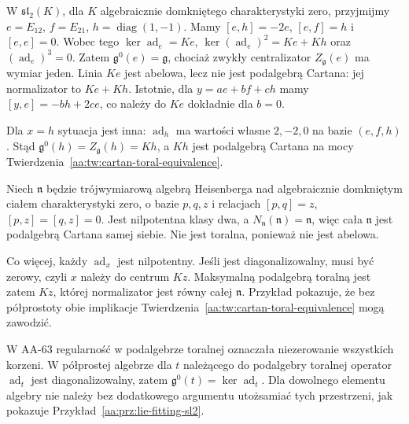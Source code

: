 \begin{przyklad}
\label{aa:prz:lie-fitting-sl2}
W $\mathfrak{sl}_2(K)$, dla $K$ algebraicznie domkniętego charakterystyki zero, przyjmijmy $e=E_{12}$, $f=E_{21}$, $h=\operatorname{diag}(1,-1)$. Mamy $[e,h]=-2e$, $[e,f]=h$ i $[e,e]=0$. Wobec tego
$\ker\operatorname{ad}_e=Ke$, $\ker(\operatorname{ad}_e)^2=Ke+Kh$ oraz $(\operatorname{ad}_e)^3=0$. Zatem $\mathfrak g^0(e)=\mathfrak g$, chociaż zwykły centralizator $Z_{\mathfrak g}(e)$ ma wymiar jeden. Linia $Ke$ jest abelowa, lecz nie jest podalgebrą Cartana: jej normalizator to $Ke+Kh$. Istotnie, dla $y=ae+bf+ch$ mamy $[y,e]=-bh+2ce$, co należy do $Ke$ dokładnie dla $b=0$.

Dla $x=h$ sytuacja jest inna: $\operatorname{ad}_h$ ma wartości własne $2,-2,0$ na bazie $(e,f,h)$. Stąd $\mathfrak g^0(h)=Z_{\mathfrak g}(h)=Kh$, a $Kh$ jest podalgebrą Cartana na mocy Twierdzenia~\ref{aa:tw:cartan-toral-equivalence}.
\end{przyklad}

\begin{przyklad}
\label{aa:prz:cartan-nontoral}
Niech $\mathfrak n$ będzie trójwymiarową algebrą Heisenberga nad algebraicznie domkniętym ciałem charakterystyki zero, o bazie $p,q,z$ i relacjach $[p,q]=z$, $[p,z]=[q,z]=0$. Jest nilpotentna klasy dwa, a $N_{\mathfrak n}(\mathfrak n)=\mathfrak n$, więc cała $\mathfrak n$ jest podalgebrą Cartana samej siebie. Nie jest toralna, ponieważ nie jest abelowa.

Co więcej, każdy $\operatorname{ad}_x$ jest nilpotentny. Jeśli jest diagonalizowalny, musi być zerowy, czyli $x$ należy do centrum $Kz$. Maksymalną podalgebrą toralną jest zatem $Kz$, której normalizator jest równy całej $\mathfrak n$. Przykład pokazuje, że bez półprostoty obie implikacje Twierdzenia~\ref{aa:tw:cartan-toral-equivalence} mogą zawodzić.
\end{przyklad}

\begin{uwaga}
W AA-63 regularność w podalgebrze toralnej oznaczała niezerowanie wszystkich korzeni. W półprostej algebrze dla $t$ należącego do podalgebry toralnej operator $\operatorname{ad}_t$ jest diagonalizowalny, zatem $\mathfrak g^0(t)=\ker\operatorname{ad}_t$. Dla dowolnego elementu algebry nie należy bez dodatkowego argumentu utożsamiać tych przestrzeni, jak pokazuje Przykład~\ref{aa:prz:lie-fitting-sl2}.
\end{uwaga}
